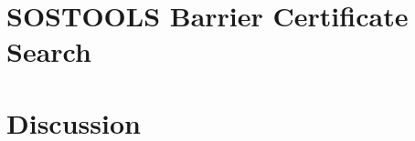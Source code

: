 \chapter{SOSTOOLS Barrier Certificate Search}\label{chap:sostools}
	
	
%	
%
%
%


\chapter{Discussion}\label{chap:conclusion}


\label{totalpage}

\begingroup
\raggedright
\clearpage
{}

\endgroup
\label{sourceliste}

\newpage


